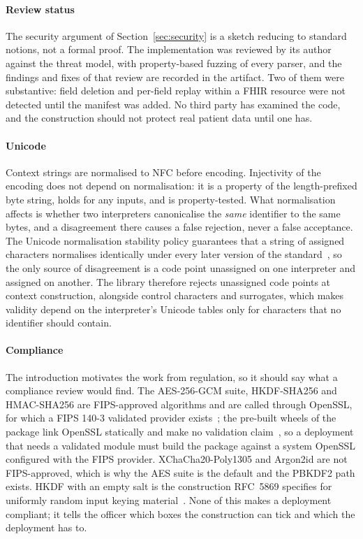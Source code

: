 \paragraph{Review status}
The security argument of Section~\ref{sec:security} is a sketch reducing to standard notions, not a formal proof. The implementation was reviewed by its author against the threat model, with property-based fuzzing of every parser, and the findings and fixes of that review are recorded in the artifact. Two of them were substantive: field deletion and per-field replay within a FHIR resource were not detected until the manifest was added. No third party has examined the code, and the construction should not protect real patient data until one has.

\paragraph{Unicode}
Context strings are normalised to NFC before encoding. Injectivity of the encoding does not depend on normalisation: it is a property of the length-prefixed byte string, holds for any inputs, and is property-tested. What normalisation affects is whether two interpreters canonicalise the \emph{same} identifier to the same bytes, and a disagreement there causes a false rejection, never a false acceptance. The Unicode normalisation stability policy guarantees that a string of assigned characters normalises identically under every later version of the standard~\cite{unicode-stability}, so the only source of disagreement is a code point unassigned on one interpreter and assigned on another. The library therefore rejects unassigned code points at context construction, alongside control characters and surrogates, which makes validity depend on the interpreter's Unicode tables only for characters that no identifier should contain.

\paragraph{Compliance}
The introduction motivates the work from regulation, so it should say what a compliance review would find. The AES-256-GCM suite, HKDF-SHA256 and HMAC-SHA256 are FIPS-approved algorithms and are called through OpenSSL, for which a FIPS 140-3 validated provider exists~\cite{openssl-fips}; the pre-built wheels of the  package link OpenSSL statically and make no validation claim~\cite{cryptography-install}, so a deployment that needs a validated module must build the package against a system OpenSSL configured with the FIPS provider. XChaCha20-Poly1305 and Argon2id are not FIPS-approved, which is why the AES suite is the default and the PBKDF2 path exists. HKDF with an empty salt is the construction RFC~5869 specifies for uniformly random input keying material~\cite{rfc5869}. None of this makes a deployment compliant; it tells the officer which boxes the construction can tick and which the deployment has to.

